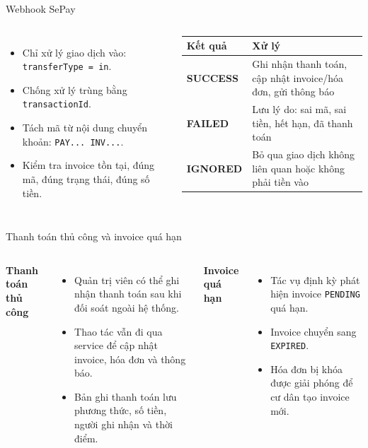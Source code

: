 \documentclass[t, aspectratio=169]{beamer}
\newcommand{\tech}[1]{\textcolor{diagramBlue}{\texttt{\footnotesize #1}}}
\begin{document}
\begin{frame}{Webhook SePay}
\begin{columns}[T,onlytextwidth]
\begin{itemize}
  \item Chỉ xử lý giao dịch vào: \tech{transferType = in}.
  \item Chống xử lý trùng bằng \tech{transactionId}.
  \item Tách mã từ nội dung chuyển khoản: \tech{PAY... INV...}.
  \item Kiểm tra invoice tồn tại, đúng mã, đúng trạng thái, đúng số tiền.
\end{itemize}
\footnotesize
\begin{tabularx}{\linewidth}{>{\bfseries\RaggedRight\arraybackslash}P{1.55cm} Q}
\toprule
Kết quả & Xử lý\\
\midrule
SUCCESS & Ghi nhận thanh toán, cập nhật invoice/hóa đơn, gửi thông báo\\
FAILED & Lưu lý do: sai mã, sai tiền, hết hạn, đã thanh toán\\
IGNORED & Bỏ qua giao dịch không liên quan hoặc không phải tiền vào\\
\bottomrule
\end{tabularx}
\end{columns}
\end{frame}

\begin{frame}{Thanh toán thủ công và invoice quá hạn}
\begin{columns}[T,onlytextwidth]
\textbf{\textcolor{hustprimary}{Thanh toán thủ công}}
\begin{itemize}
  \item Quản trị viên có thể ghi nhận thanh toán sau khi đối soát ngoài hệ thống.
  \item Thao tác vẫn đi qua service để cập nhật invoice, hóa đơn và thông báo.
  \item Bản ghi thanh toán lưu phương thức, số tiền, người ghi nhận và thời điểm.
\end{itemize}
\textbf{\textcolor{hustprimary}{Invoice quá hạn}}
\begin{itemize}
  \item Tác vụ định kỳ phát hiện invoice \tech{PENDING} quá hạn.
  \item Invoice chuyển sang \tech{EXPIRED}.
  \item Hóa đơn bị khóa được giải phóng để cư dân tạo invoice mới.
\end{itemize}
\end{columns}
\end{frame}
\end{document}
